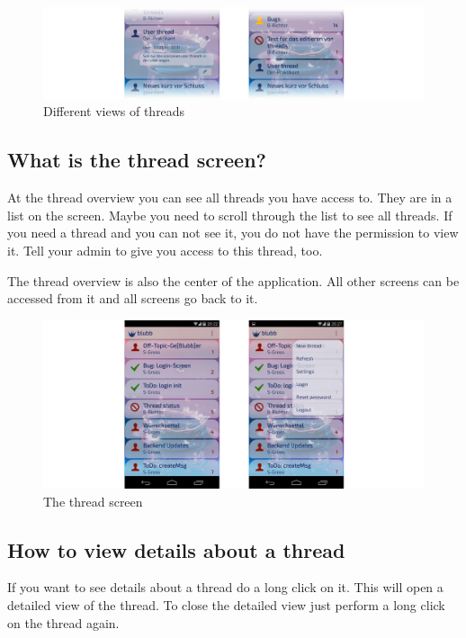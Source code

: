 \documentclass[12pt,a4paper,oneside]{report}
\begin{document}
\begin{figure}[!ht]
    \includegraphics[width=\linewidth]{Threads.png}
    \caption{Different views of threads}
\end{figure}


\subsection{What is the thread screen?}
At the thread overview you can see all threads you have access to.
They are in a list on the screen. Maybe you need to scroll through the list to see all threads. If you need a thread and you can not see it, you do not have the permission to view it. Tell your admin to give you access to this thread, too. 

The thread overview is also the center of the application. All other screens can be accessed from it and all screens go back to it.\\

\begin{figure}[!ht]
    \includegraphics[width=\linewidth]{ThreadScreen.png}
    \caption{The thread screen}
\end{figure}

\subsection{How to view details about a thread}
If you want to see details about a thread do a long click on it. This will open a detailed view of the thread. To close the detailed view just perform a long click on the thread again.
\end{document}
